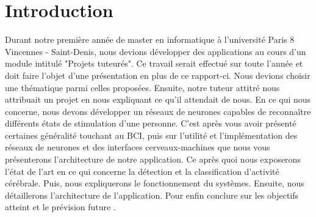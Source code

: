 \part*{Introduction}

 Durant notre première année de master en informatique à l'université Paris 8 Vincennes - Saint-Denis, nous devions développer des applications au cours d'un module intitulé "Projets tuteurés".
 Ce travail serait effectué sur toute l'année et doit faire l'objet d'une présentation en plus de ce rapport-ci. Nous devions choisir une thématique parmi celles proposées.
 Ensuite, notre tuteur attitré nous attribuait un projet en nous expliquant ce qu'il attendait de nous. En ce qui nous concerne, nous devons développer un réseaux de neurones capables de reconnaître différents états de stimulation d'une personne.
 C'est après vous avoir présenté certaines généralité touchant au BCI, puis sur l'utilité et l'implémentation des réseaux de neurones et des interfaces cerveaux-machines que nous vous présenterons l'architecture de notre application. Ce après quoi nous exposerons l'état de l'art en ce qui concerne la détection et la classification d'activité cérébrale. Puis, nous expliquerons le fonctionnement du systèmes. Ensuite, nous détaillerons l'architecture de l'application. Pour enfin conclure sur les objectifs atteint et le prévision future .  